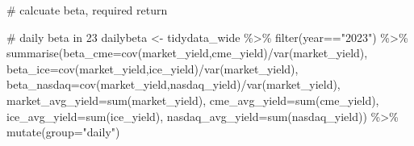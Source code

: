 \documentclass[
  a4paper,
  DIV=11,
  numbers=noendperiod]{scrreprt}
\newenvironment{Shaded}{\begin{snugshade}}{\end{snugshade}}
\newcommand{\AttributeTok}[1]{\textcolor[rgb]{0.40,0.45,0.13}{#1}}
\newcommand{\CommentTok}[1]{\textcolor[rgb]{0.37,0.37,0.37}{#1}}
\newcommand{\FunctionTok}[1]{\textcolor[rgb]{0.28,0.35,0.67}{#1}}
\newcommand{\NormalTok}[1]{\textcolor[rgb]{0.00,0.23,0.31}{#1}}
\newcommand{\OtherTok}[1]{\textcolor[rgb]{0.00,0.23,0.31}{#1}}
\newcommand{\SpecialCharTok}[1]{\textcolor[rgb]{0.37,0.37,0.37}{#1}}
\newcommand{\StringTok}[1]{\textcolor[rgb]{0.13,0.47,0.30}{#1}}
\begin{document}
\begin{Shaded}
\begin{Highlighting}[]
\CommentTok{\# calcuate beta, required return}

\CommentTok{\# daily beta in \textquotesingle{}23}
\NormalTok{dailybeta }\OtherTok{\textless{}{-}}\NormalTok{ tidydata\_wide }\SpecialCharTok{\%\textgreater{}\%} 
  \FunctionTok{filter}\NormalTok{(year}\SpecialCharTok{==}\StringTok{"2023"}\NormalTok{) }\SpecialCharTok{\%\textgreater{}\%} 
  \FunctionTok{summarise}\NormalTok{(}\AttributeTok{beta\_cme=}\FunctionTok{cov}\NormalTok{(market\_yield,cme\_yield)}\SpecialCharTok{/}\FunctionTok{var}\NormalTok{(market\_yield),}
            \AttributeTok{beta\_ice=}\FunctionTok{cov}\NormalTok{(market\_yield,ice\_yield)}\SpecialCharTok{/}\FunctionTok{var}\NormalTok{(market\_yield),}
            \AttributeTok{beta\_nasdaq=}\FunctionTok{cov}\NormalTok{(market\_yield,nasdaq\_yield)}\SpecialCharTok{/}\FunctionTok{var}\NormalTok{(market\_yield),}
            \AttributeTok{market\_avg\_yield=}\FunctionTok{sum}\NormalTok{(market\_yield),}
            \AttributeTok{cme\_avg\_yield=}\FunctionTok{sum}\NormalTok{(cme\_yield),}
            \AttributeTok{ice\_avg\_yield=}\FunctionTok{sum}\NormalTok{(ice\_yield),}
            \AttributeTok{nasdaq\_avg\_yield=}\FunctionTok{sum}\NormalTok{(nasdaq\_yield)) }\SpecialCharTok{\%\textgreater{}\%} 
  \FunctionTok{mutate}\NormalTok{(}\AttributeTok{group=}\StringTok{"daily"}\NormalTok{)}


\end{Highlighting}
\end{Shaded}
\end{document}
